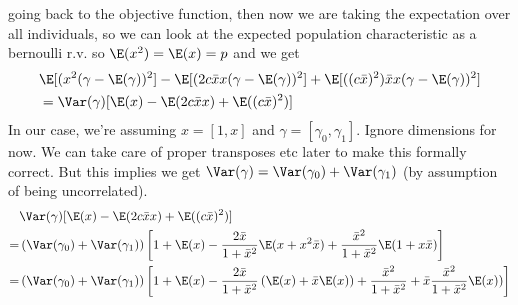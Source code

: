 going back to the objective function, then now we are taking the expectation over all individuals, so we can look at the expected population characteristic as a bernoulli r.v. so
$\E(x^2) = \E(x) = p$ and we get
 \begin{align*}
	 &\E[ ( x^2 (\gamma - \E(\gamma))^2]  - \E[ ( 2 c \bar{x}x (\gamma - \E(\gamma))^2] + \E[ ( (c \bar{x})^2) \bar{x}x (\gamma - \E(\gamma))^2] \\
	 &= \Var(\gamma) [\E(x) - \E(2c\bar{x} x) + \E((c\bar{x})^2)]
\end{align*} 
In our case, we're assuming $x=[1, x]$ and  $\gamma = [\gamma_0, \gamma_1]$. Ignore dimensions for now. We can take care of proper transposes etc later to make this formally correct. But this implies we get $\Var(\gamma) = \Var(\gamma_0) + \Var(\gamma_1)$ (by assumption of being uncorrelated).
\begin{align*}
	  &\Var(\gamma) [\E(x) - \E(2c\bar{x} x) + \E((c\bar{x})^2)] \\
	= &\left( \Var(\gamma_0) + \Var(\gamma_1) \right)\left[1 + \E(x) - \frac{2\bar{x}}{1 + \bar{x}^2} \E(x + x^2 \bar{x}) + \frac{\bar{x}^2}{1 + \bar{x}^2} \E(1 + x \bar{x}) \right] \\
	= &\left( \Var(\gamma_0) + \Var(\gamma_1) \right)\left[1 + \E(x) - \frac{2\bar{x}}{1 + \bar{x}^2} \left(\E(x) +  \bar{x}\E(x)\right) + \frac{\bar{x}^2}{1 + \bar{x}^2} + \bar{x}\frac{\bar{x}^2}{1 + \bar{x}^2} \E(x) ) \right] \\
\end{align*} 



